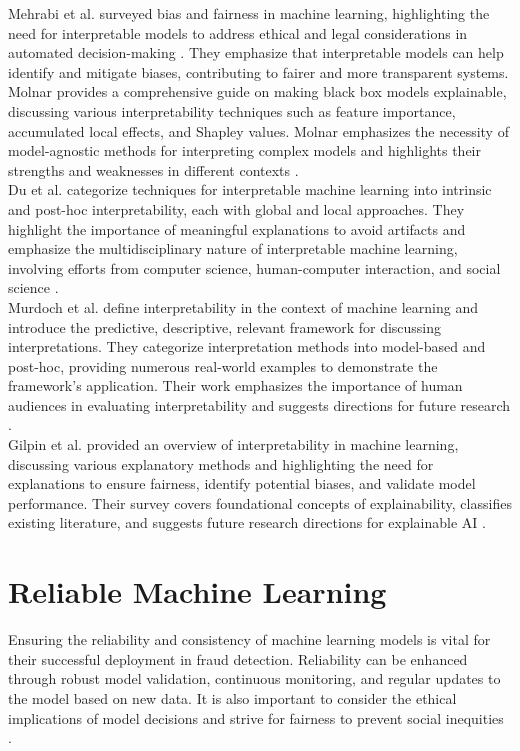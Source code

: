 \documentclass[12pt,a4paper]{report}
\begin{document}
Mehrabi et al. surveyed bias and fairness in machine learning, highlighting the need for interpretable models to address ethical and legal considerations in automated decision-making \citep[p.12]{mehrabi2021survey}. They emphasize that interpretable models can help identify and mitigate biases, contributing to fairer and more transparent systems.\\

Molnar provides a comprehensive guide on making black box models explainable, discussing various interpretability techniques such as feature importance, accumulated local effects, and Shapley values. Molnar emphasizes the necessity of model-agnostic methods for interpreting complex models and highlights their strengths and weaknesses in different contexts \citep[p.1]{molnar2020interpretable}.\\

Du et al. categorize techniques for interpretable machine learning into intrinsic and post-hoc interpretability, each with global and local approaches. They highlight the importance of meaningful explanations to avoid artifacts and emphasize the multidisciplinary nature of interpretable machine learning, involving efforts from computer science, human-computer interaction, and social science \citep[p.68]{du2019techniques}.\\

Murdoch et al. define interpretability in the context of machine learning and introduce the predictive, descriptive, relevant framework for discussing interpretations. They categorize interpretation methods into model-based and post-hoc, providing numerous real-world examples to demonstrate the framework's application. Their work emphasizes the importance of human audiences in evaluating interpretability and suggests directions for future research \citep[p. 22071]{murdoch2019definitions}.\\

Gilpin et al. provided an overview of interpretability in machine learning, discussing various explanatory methods and highlighting the need for explanations to ensure fairness, identify potential biases, and validate model performance. Their survey covers foundational concepts of explainability, classifies existing literature, and suggests future research directions for explainable AI \citep[p. 80]{gilpin2018explaining}.

\section{Reliable Machine Learning}
Ensuring the reliability and consistency of machine learning models is vital for their successful deployment in fraud detection. Reliability can be enhanced through robust model validation, continuous monitoring, and regular updates to the model based on new data. It is also important to consider the ethical implications of model decisions and strive for fairness to prevent social inequities \citep[p.12]{mehrabi2021survey}.\\
\end{document}
